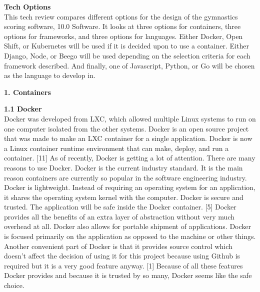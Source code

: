 \documentclass[letterpaper,10pt,draftclsnofoot,onecolumn,]{IEEEtran}
\begin{document}
\textbf{Tech Options}\\
This tech review compares different options for the design of the gymnastics scoring software, 10.0 Software. It looks at three options for containers, three options for frameworks, and three options for languages. Either Docker, Open Shift, or Kubernetes will be used if it is decided upon to use a container.  Either Django, Node, or Beego will be used depending on the selection criteria for each framework described. And finally, one of Javascript, Python, or Go will be chosen as the language to develop in.\\

\begin{center}
\textbf{1. Containers}\\
\end{center}

\textbf{1.1 Docker}\\
Docker was developed from LXC, which allowed multiple Linux systems to run on one computer isolated from the other systems. Docker is an open source project that was made to make an LXC container for a single application. Docker is now a Linux container runtime environment that can make, deploy, and run a container. [11] As of recently, Docker is getting a lot of attention. There are many reasons to use Docker. Docker is the current industry standard. It is the main reason containers are currently so popular in the software engineering industry. Docker is lightweight. Instead of requiring an operating system for an application, it shares the operating system kernel with the computer. Docker is secure and trusted. The application will be safe inside the Docker container. [5] Docker provides all the benefits of an extra layer of abstraction without very much overhead at all. Docker also allows for portable shipment of applications. Docker is focused primarily on the application as opposed to the machine or other things. Another convenient part of Docker is that it provides source control which doesn't affect the decision of using it for this project because using Github is required but it is a very good feature anyway. [1] Because of all these features Docker provides and because it is trusted by so many, Docker seems like the safe choice.\\
\end{document}
